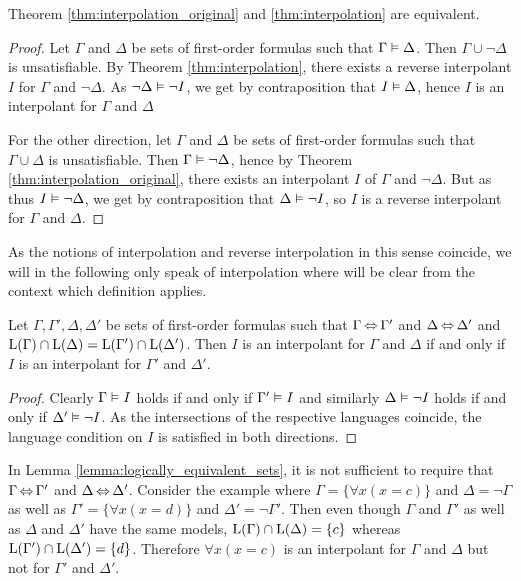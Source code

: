 \begin{prop}
	Theorem \ref{thm:interpolation_original} and \ref{thm:interpolation} are equivalent.
	\label{prop:interpolations_equivalent}
\end{prop}
\begin{proof}
	Let $\Gamma$ and $\Delta$ be sets of first-order formulas such that $ \Gamma \vDash \Delta$.
	Then $\Gamma \cup \lnot \Delta$ is unsatisfiable.
	By Theorem \ref{thm:interpolation}, there exists a reverse interpolant $I$ for $\Gamma$ and $\lnot \Delta$.
	As $\lnot \Delta \vDash \lnot I$, we get by contraposition that $I \vDash \Delta$, hence $I$ is an interpolant for $\Gamma$ and $\Delta$

	For the other direction,
	let $\Gamma$ and $\Delta$ be sets of first-order formulas such that $ \Gamma \cup \Delta$ is unsatisfiable.
	Then $\Gamma \vDash \lnot \Delta$, hence by Theorem \ref{thm:interpolation_original}, there exists an interpolant $I$ of $\Gamma$ and $\lnot \Delta$.
	But as thus $ I\vDash \lnot \Delta$, we get by contraposition that $\Delta \vDash \lnot I$, so $I$ is a reverse interpolant for $\Gamma$ and $\Delta$.
\end{proof}

As the notions of interpolation and reverse interpolation in this sense coincide, we will in the following only speak of interpolation where  will be clear from the context which definition applies.

\begin{lemma}
	\label{lemma:logically_equivalent_sets}
	Let $\Gamma, \Gamma', \Delta, \Delta'$ be sets of first-order formulas such that $\Gamma \operatorname{\Leftrightarrow} \Gamma'$ and $\Delta \operatorname{\Leftrightarrow} \Delta'$ and $\operatorname{L}(\Gamma) \cap \operatorname{L}(\Delta) = \operatorname{L}(\Gamma') \cap \operatorname{L}(\Delta')$.
	Then $I$ is an interpolant for $\Gamma$ and $\Delta$ if and only if $I$ is an interpolant for $\Gamma'$ and $\Delta'$.
\end{lemma}
\begin{proof}
	Clearly $\Gamma \vDash I$ holds if and only if $\Gamma' \vDash I$ and similarly
	$\Delta \vDash \lnot I$ holds if and only if $\Delta' \vDash \lnot I$.
	As the intersections of the respective languages coincide, the language condition on $I$ is satisfied in both directions.
\end{proof}

\begin{remark}
	In Lemma \ref{lemma:logically_equivalent_sets}, it is not sufficient to require that $\Gamma \operatorname{\Leftrightarrow} \Gamma'$ and $\Delta \operatorname{\Leftrightarrow} \Delta'$. 
	Consider the example where
	$\Gamma = \{ \forall x (x=c)\}$ and $\Delta = \lnot \Gamma$
	as well as  
	$\Gamma' = \{ \forall x (x=d)\}$ and $\Delta' = \lnot \Gamma'$.
	Then even though $\Gamma$ and $\Gamma'$ as well as $\Delta$ and $\Delta'$ have the same models,
	$\operatorname{L}(\Gamma) \cap \operatorname{L}(\Delta) = \{c\}$
	whereas
	$\operatorname{L}(\Gamma') \cap \operatorname{L}(\Delta') = \{d\}$.
	Therefore $\forall x (x=c)$ is an interpolant for $\Gamma$ and $\Delta$ but not for $\Gamma'$ and $\Delta'$.
\end{remark}




